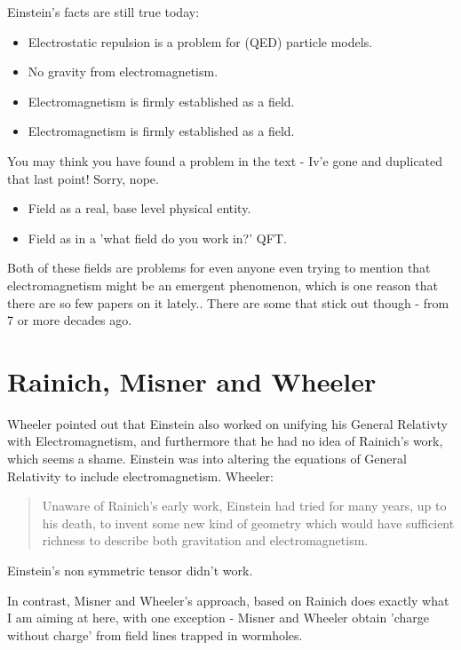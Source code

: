 \documentclass[../rzero]{subfiles}
\begin{document}
Einstein's facts are still true today:
\begin{itemize}
	\item Electrostatic repulsion is a problem for (QED) particle models.
	\item No gravity from electromagnetism.
	\item Electromagnetism is firmly established as a field.
	\item Electromagnetism is firmly established as a field.
\end{itemize}

You may think you have found a problem in the text - Iv'e gone and duplicated that last point! Sorry, nope. 

\begin{itemize}
	\item Field as a real, base level physical entity.
	\item Field as in a 'what field do you work in?' QFT.
\end{itemize}

Both of these fields are problems for even anyone even trying to mention that electromagnetism might be an emergent phenomenon, which is one reason that there are so few papers on it lately.\cite{barceloElectromagnetismEmergentPhenomenon2014}. There are some that stick out though - from 7 or more decades ago.

\section{Rainich, Misner and Wheeler}

Wheeler pointed out that Einstein also worked on unifying his General Relativty with Electromagnetism, and furthermore that he had no idea of Rainich's work, which seems a shame. Einstein was into altering the equations of General Relativity to include electromagnetism. Wheeler\cite{wheelerCurvedEmptySpaceTime1966}: 

\begin{quotation}
	 Unaware of Rainich's early work, Einstein had tried for many years, up to his death, to invent some new kind of geometry\cite{einstein2003meaning} which would have sufficient richness to describe both gravitation and electromagnetism.
\end{quotation}
	Einstein's non symmetric tensor didn't work. 
	
In contrast, Misner and Wheeler's approach\cite{Misner:1957mt}\cite{Wheeler1957quantumGeo}, based on Rainich\cite{rainichElectrodynamicsGeneralRelativity1925} does exactly what I am aiming at here, with one exception - Misner and Wheeler obtain 'charge without charge' from field lines trapped in wormholes. 
\end{document}
